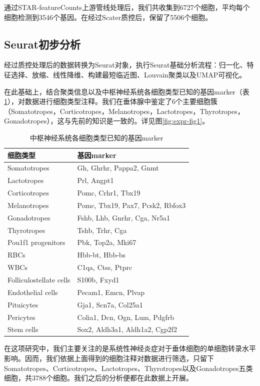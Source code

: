   通过STAR-featureCounts上游管线处理后，我们共收集到6727个细胞，平均每个细胞检测到3546个基因。在经过Scater质控后，保留了5506个细胞。
\subsection{Seurat初步分析}
  经过质控处理后的数据转换为Seurat对象，执行Seurat基础分析流程：归一化、特征选择、放缩、线性降维、构建最短临近图、Louvain聚类以及UMAP可视化。

  在此基础上，结合聚类信息以及中枢神经系统各细胞类型已知的基因marker（表\ref{tab:gene-marker}），对数据进行细胞类型注释。我们在垂体腺中鉴定了6个主要细胞簇（Somatotropes，Corticotropes，Melanotropes，Lactotropes，Thyrotropes，Gonadotropes），这与先前的知识是一致的。详见图\ref{fig:expr-fig1}。
\begin{table}[ht]
    \centering
    \caption{中枢神经系统各细胞类型已知的基因marker}
    \label{tab:gene-marker}
    \begin{tabular}{ll}
        \toprule
        细胞类型 & 基因marker \\
        \midrule
        Somatotropes & Gh, Ghrhr, Pappa2, Gnmt \\
        Lactotropes & Prl, Angpt1 \\
        Corticotropes & Pomc, Crhr1, Tbx19 \\
        Melanotropes & Pomc, Tbx19, Pax7, Pcsk2, Rbfox3 \\
        Gonadotropes & Fshb, Lhb, Gnrhr, Cga, Nr5a1 \\
        Thyrotropes & Tshb, Trhr, Cga \\
        Pou1f1 progenitors & Pbk, Top2a, Mki67 \\
        RBCs & Hbb-bt, Hbb-bs \\
        WBCs & C1qa, Ctss, Ptprc \\
        Folliculostellate cells & S100b, Fxyd1 \\
        Endothelial cells & Pecam1, Emcn, Plvap \\
        Pituicytes & Gja1, Scn7a, Col25a1 \\
        Pericytes & Colia1, Dcn, Ogn, Lum, Pdgfrb \\
        Stem cells & Sox2, Aldh3a1, Aldh1a2, Cgp2f2 \\
        \bottomrule
    \end{tabular}
\end{table}

  在这项研究中，我们主要关注的是系统性神经炎症对于垂体细胞的单细胞转录水平影响。因而，我们依据上面得到的细胞注释对数据进行筛选，只留下Somatotropes、Corticotropes、Lactotropes、Thyrotropes以及Gonadotropes五类细胞，共3788个细胞。我们之后的分析便都在此数据上开展。


